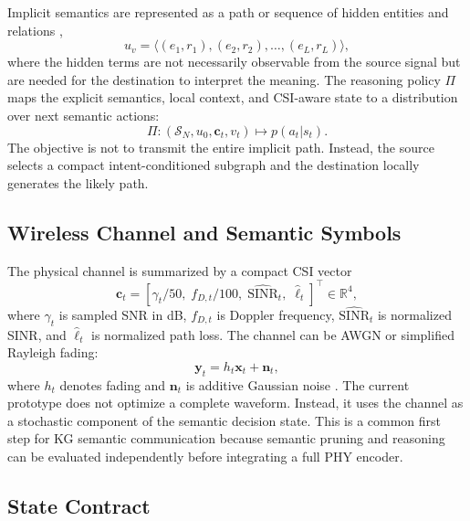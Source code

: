 \documentclass[journal]{IEEEtran}
\newcommand{\SG}{\mathcal{S}}
\newcommand{\R}{\mathbb{R}}
\begin{document}
Implicit semantics are represented as a path or sequence of hidden entities and relations \cite{sun2026hierarchy,xiao2024reasoning},
\begin{equation}
u_v = \langle (e_1,r_1),(e_2,r_2),\ldots,(e_L,r_L)\rangle,
\end{equation}
where the hidden terms are not necessarily observable from the source signal but are needed for the destination to interpret the meaning. The reasoning policy $\Pi$ maps the explicit semantics, local context, and CSI-aware state to a distribution over next semantic actions:
\begin{equation}
\Pi: (\SG_N,u_0,\mathbf{c}_t,v_t)\mapsto p(a_t|s_t).
\end{equation}
The objective is not to transmit the entire implicit path. Instead, the source selects a compact intent-conditioned subgraph and the destination locally generates the likely path.

\subsection{Wireless Channel and Semantic Symbols}

The physical channel is summarized by a compact CSI vector
\begin{equation}
\mathbf{c}_t =
[\gamma_t/50,\; f_{D,t}/100,\; \widehat{\mathrm{SINR}}_t,\; \widehat{\ell}_t]^\top
\in\R^4,
\label{eq:csi_vector}
\end{equation}
where $\gamma_t$ is sampled SNR in dB, $f_{D,t}$ is Doppler frequency, $\widehat{\mathrm{SINR}}_t$ is normalized SINR, and $\widehat{\ell}_t$ is normalized path loss. The channel can be AWGN or simplified Rayleigh fading:
\begin{equation}
\mathbf{y}_t=h_t\mathbf{x}_t+\mathbf{n}_t,
\end{equation}
where $h_t$ denotes fading and $\mathbf{n}_t$ is additive Gaussian noise \cite{shannon1948mathematical,bourtsoulatze2019deep}. The current prototype does not optimize a complete waveform. Instead, it uses the channel as a stochastic component of the semantic decision state. This is a common first step for KG semantic communication because semantic pruning and reasoning can be evaluated independently before integrating a full PHY encoder.

\subsection{State Contract}
\end{document}
